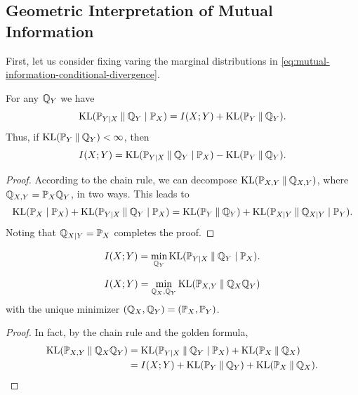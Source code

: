 \subsection{Geometric Interpretation of Mutual Information}
First, let us consider fixing varing the marginal distributions in \eqref{eq:mutual-information-conditional-divergence}.
\begin{theorem}
    For any $\QQ_Y$ we have 
    \[\KL(\PP_{Y|X}\mmid \QQ_Y\mid \PP_X)=I(X;Y)+\KL(\PP_Y\mmid \QQ_Y).\]
    Thus, if $\KL(\PP_Y\mmid \QQ_Y)<\infty$, then 
    \[I(X;Y)=\KL(\PP_{Y|X}\mmid \QQ_Y\mid \PP_X)-\KL(\PP_Y\mmid \QQ_Y).\]
\end{theorem}
\begin{proof}
    According to the chain rule, we can decompose $\KL(\PP_{X,Y}\mmid \QQ_{X,Y})$, where $\QQ_{X,Y}=\PP_X\QQ_Y$, in two ways. 
    This leads to 
    \[\KL(\PP_X\mid\PP_X)+\KL(\PP_{Y|X}\mmid \QQ_Y\mid \PP_X)=\KL(\PP_Y\mmid\QQ_Y)+\KL(\PP_{X|Y}\mmid \QQ_{X|Y}\mid\PP_Y).\]
    Noting that $\QQ_{X|Y}=\PP_X$ completes the proof.
\end{proof}

\begin{corollary}
    \begin{equation}\label{eq:mutual-information-center-of-gravity}
        I(X;Y)=\min_{\QQ_Y}\KL(\PP_{Y|X}\mmid \QQ_Y\mid \PP_X).
    \end{equation}
\end{corollary}

\begin{corollary}
    \[I(X;Y)=\min_{\QQ_X,\QQ_Y}\KL(\PP_{X,Y}\mmid \QQ_X\QQ_Y)\]
    with the unique minimizer $(\QQ_X,\QQ_Y)=(\PP_X,\PP_Y)$.
\end{corollary}
\begin{proof}
    In fact, by the chain rule and the golden formula,
    \begin{align*}
        \KL(\PP_{X,Y}\mmid\QQ_X\QQ_Y)&=\KL(\PP_{Y|X}\mmid\QQ_Y\mid\PP_X)+\KL(\PP_X\mmid\QQ_X)\\
        &=I(X;Y)+\KL(\PP_Y\mmid \QQ_Y)+\KL(\PP_X\mmid\QQ_X).
    \end{align*}
\end{proof}

